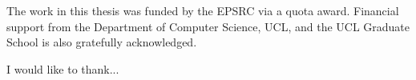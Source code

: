 
\begin{acknowledgements}

The work in this thesis was funded by the EPSRC via a quota award. 
Financial support from the Department of Computer Science, UCL, and
the UCL Graduate School is also gratefully acknowledged.

\medskip

I would like to thank...

\end{acknowledgements}

